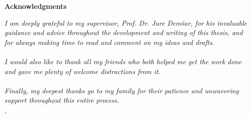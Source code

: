 \thispagestyle{empty}

\begin{center}
{\Large \textbf{\sc Acknowledgments}}
\end{center}
\vspace{0.5cm}

{\it\noindent
I am deeply grateful to my supervisor, Prof. Dr. Jure Demšar, for his invaluable guidance and advice throughout the development and writing of this thesis, and for always making time to read and comment on my ideas and drafts.
\\ \\
I would also like to thank all my friends who both helped me get the work done and gave me plenty of welcome distractions from it.
\\ \\
Finally, my deepest thanks go to my family for their patience and unwavering support throughout this entire process.\\
\vspace{0.5cm} \hfill \tauthor, \myyear
}